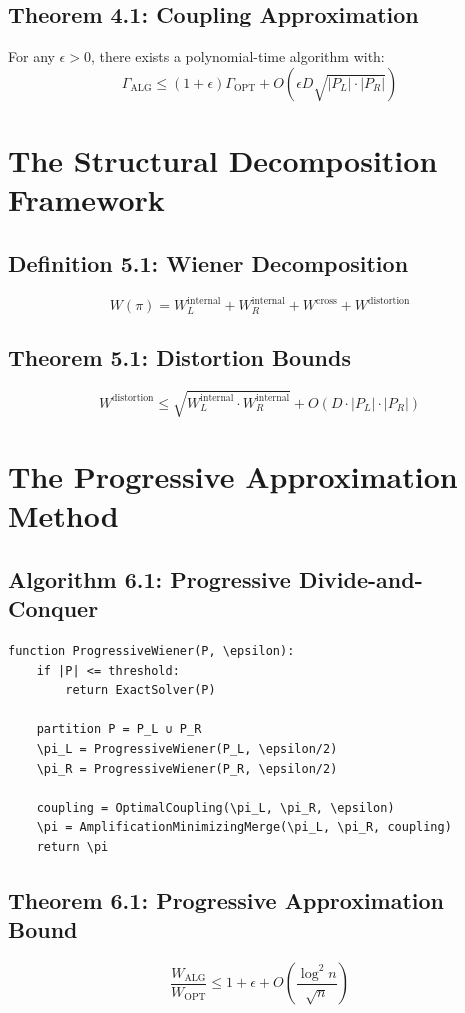 \documentclass{article}
\begin{document}
\subsection*{Theorem 4.1: Coupling Approximation}
For any $\epsilon > 0$, there exists a polynomial-time algorithm with:
\[
	\Gamma_{\text{ALG}} \leq (1 + \epsilon) \Gamma_{\text{OPT}} + O(\epsilon D \sqrt{|P_L| \cdot |P_R|})
\]

\section{The Structural Decomposition Framework}

\subsection*{Definition 5.1: Wiener Decomposition}
\[
	W(\pi) = W_L^{\text{internal}} + W_R^{\text{internal}} + W^{\text{cross}} + W^{\text{distortion}}
\]

\subsection*{Theorem 5.1: Distortion Bounds}
\[
	W^{\text{distortion}} \leq \sqrt{W_L^{\text{internal}} \cdot W_R^{\text{internal}}} + O(D \cdot |P_L| \cdot |P_R|)
\]

\section{The Progressive Approximation Method}

\subsection*{Algorithm 6.1: Progressive Divide-and-Conquer}
\begin{verbatim}
function ProgressiveWiener(P, \epsilon):
    if |P| <= threshold:
        return ExactSolver(P)

    partition P = P_L ∪ P_R
    \pi_L = ProgressiveWiener(P_L, \epsilon/2)
    \pi_R = ProgressiveWiener(P_R, \epsilon/2)

    coupling = OptimalCoupling(\pi_L, \pi_R, \epsilon)
    \pi = AmplificationMinimizingMerge(\pi_L, \pi_R, coupling)
    return \pi
\end{verbatim}

\subsection*{Theorem 6.1: Progressive Approximation Bound}
\[
	\frac{W_{\text{ALG}}}{W_{\text{OPT}}} \leq 1 + \epsilon + O\left(\frac{\log^2 n}{\sqrt{n}}\right)
\]
\end{document}
